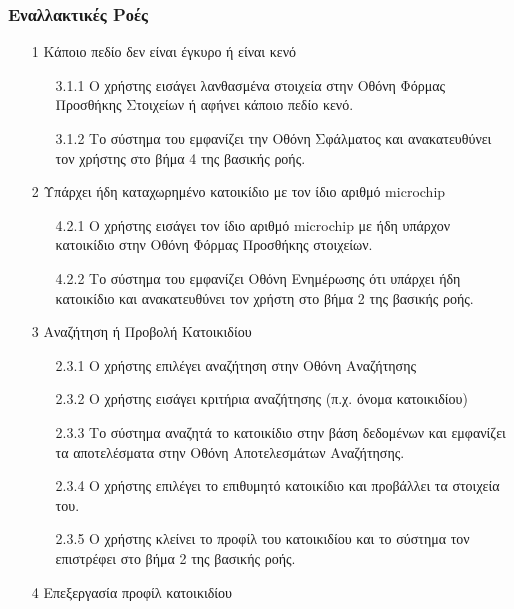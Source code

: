 \documentclass[12pt,a4paper,twoside]{book}
\begin{document}
\subsubsection{Εναλλακτικές Ροές}
\begin{enumerate}
  \item[1 ] Κάποιο πεδίο δεν είναι έγκυρο ή είναι κενό   %
        \begin{enumerate}
          \item[3.1.1 ] Ο χρήστης εισάγει λανθασμένα στοιχεία στην Οθόνη Φόρμας Προσθήκης Στοιχείων ή αφήνει κάποιο πεδίο κενό. %
          \item[3.1.2 ] Το σύστημα του εμφανίζει την Οθόνη Σφάλματος και ανακατευθύνει τον χρήστης στο βήμα 4 της βασικής ροής. %
        \end{enumerate}
  \item[2 ] Υπάρχει ήδη καταχωρημένο κατοικίδιο με τον ίδιο αριθμό microchip  %
        \begin{enumerate}
          \item[4.2.1 ] Ο χρήστης εισάγει τον ίδιο αριθμό microchip με ήδη υπάρχον κατοικίδιο  στην Οθόνη Φόρμας Προσθήκης στοιχείων. %
          \item[4.2.2 ] Το σύστημα του εμφανίζει Οθόνη Ενημέρωσης ότι υπάρχει ήδη κατοικίδιο και ανακατευθύνει τον χρήστη στο βήμα 2 της βασικής ροής. %
        \end{enumerate}
  \item[3 ] Αναζήτηση ή Προβολή Κατοικιδίου %
        \begin{enumerate}
          \item[2.3.1 ] Ο χρήστης επιλέγει αναζήτηση στην Οθόνη Αναζήτησης %
          \item[2.3.2 ] Ο χρήστης εισάγει κριτήρια αναζήτησης (π.χ. όνομα κατοικιδίου) %
          \item[2.3.3 ] Το σύστημα αναζητά το κατοικίδιο στην βάση δεδομένων και εμφανίζει τα αποτελέσματα στην Οθόνη Αποτελεσμάτων Αναζήτησης. %
          \item[2.3.4 ] Ο χρήστης επιλέγει το επιθυμητό κατοικίδιο και προβάλλει τα στοιχεία του. %
          \item[2.3.5 ] Ο χρήστης κλείνει το προφίλ του κατοικιδίου και το σύστημα τον επιστρέφει στο βήμα 2 της βασικής ροής. %
        \end{enumerate}
  \item[4 ] Επεξεργασία προφίλ κατοικιδίου %

\end{enumerate}
\end{document}

